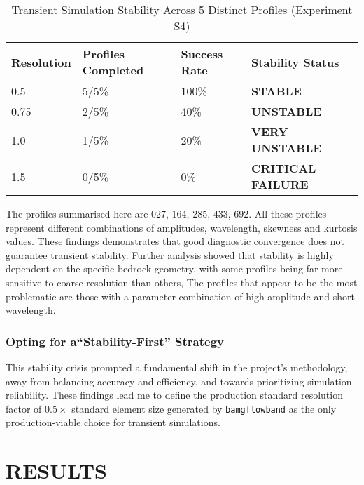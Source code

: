 \begin{table}[h]
\centering
\caption{Transient Simulation Stability Across 5 Distinct Profiles (Experiment S4)}
\begin{tabular}{llll}
\toprule
Resolution & Profiles Completed & Success Rate & Stability Status \\
\midrule
0.5 & 5/5\% & 100\% & \textbf{STABLE} \\
0.75 & 2/5\% & 40\% & \textbf{UNSTABLE} \\
1.0 & 1/5\% & 20\% & \textbf{VERY UNSTABLE} \\
1.5 & 0/5\% & 0\% & \textbf{CRITICAL FAILURE} \\
\bottomrule
\end{tabular}
\end{table}
The profiles summarised here are 027, 164, 285, 433, 692. All these profiles represent different combinations of amplitudes, wavelength, skewness and kurtosis values. These findings demonstrates that good diagnostic convergence does not guarantee transient stability. Further analysis showed that stability is highly dependent on the specific bedrock geometry, with some profiles being far more sensitive to coarse resolution than others, The profiles that appear to be the most problematic are those with a parameter combination of high amplitude and short wavelength.

\subsubsection{Opting for a``Stability-First'' Strategy}

This stability crisis prompted a fundamental shift in the project's methodology, away from balancing accuracy and efficiency, and towards prioritizing simulation reliability. These findings lead me to define the production standard resolution factor of $0.5\times$ standard element size generated by \texttt{bamgflowband} as the only production-viable choice for transient simulations.

\section{RESULTS}


